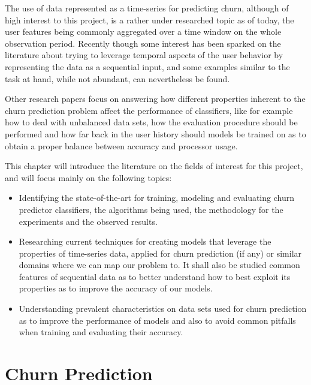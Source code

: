 \documentclass{kththesis}
\begin{document}
The use of data represented as a time-series for predicting churn, although of high interest to this project, is a rather under researched topic as of today, the user features being commonly aggregated over a time window on the whole observation period. Recently though some interest has been sparked on the literature about trying to leverage temporal aspects of the user behavior by representing the data as a sequential input, and some examples similar to the task at hand, while not abundant, can nevertheless be found. 

Other research papers focus on answering how different properties inherent to the churn prediction problem affect the performance of classifiers, like for example how to deal with unbalanced data sets, how the evaluation procedure should be performed and how far back in the user history should models be trained on as to obtain a proper balance between accuracy and processor usage.  

This chapter will introduce the literature on the fields of interest for this project, and will focus mainly on the following topics:

\begin{itemize}
\item Identifying the state-of-the-art for training, modeling and evaluating churn predictor classifiers, the algorithms being used, the methodology for the experiments and the observed results.

\item Researching current techniques for creating models that leverage the properties of time-series data, applied for churn prediction (if any) or similar domains where we can map our problem to. It shall also be studied common features of sequential data as to better understand how to best exploit its properties as to improve the accuracy of our models.

\item Understanding prevalent characteristics on data sets used for churn prediction as to improve the performance of models and also to avoid common pitfalls when training and evaluating their accuracy.
 
\end{itemize}


\section{Churn Prediction}
\end{document}
